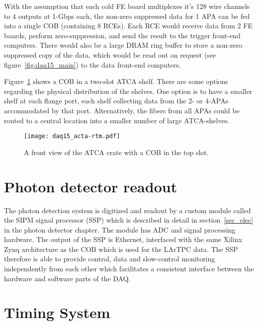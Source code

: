 With 
the assumption that each cold FE board multiplexes it's 128 wire
channels to 4 outputs at 1-Gbps each, the non-zero suppressed data for
1 APA can be fed into a single COB (containing 8 RCEs).  Each RCE
would receive data from 2 FE boards, perform zero-suppression, and
send the result to the trigger front-end computers.  There would also
be a large DRAM ring buffer to store a non-zero suppressed copy of the
data, which would be read out on request (see
figure~\ref{fig:daq15_main}) to the data front-end computers.

Figure~\ref{fig:daq15_atcapic} shows a COB in a two-slot ATCA shelf.
There are some options regarding the physical distribution of the
shelves.  One option is to have a smaller shelf at each flange port,
each shelf collecting data from the 2- or 4-APAs accommodated by that
port.  Alternatively, the fibers from all APAs could be routed to a
central location into a smaller number of large ATCA-shelves.

\begin{figure}[hbt]
  \texttt{[image: daq15\_acta-rtm.pdf]}
    \caption{\label{fig:daq15_atcapic}A front view of the ATCA crate with a COB in the top slot. }
\end{figure}

\section{Photon detector readout}
\label{sec:daq_ssp}

The photon detection system is digitized and readout by a custom
module called the SIPM signal processor (SSP) which is described in
detail in section~\ref{sec_elec} in the photon detector chapter.
The module has ADC and signal processing hardware.  The output of the
SSP is Ethernet, interfaced with the same Xilinx Zynq architecture as
the COB which is used for the LArTPC data. The SSP therefore is able
to provide control, data and slow-control monitoring independently
from each other which facilitates a consistent interface between the
hardware and software parts of the DAQ.

\section{Timing System }
\label{sec:daq_time}

